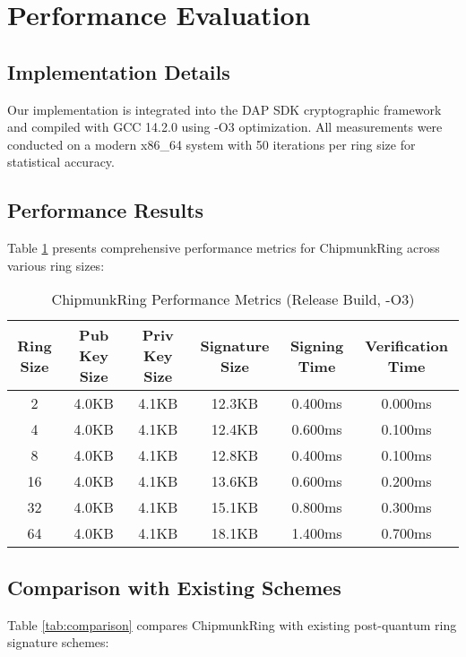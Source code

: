 \documentclass[11pt,a4paper]{article}
\begin{document}
\section{Performance Evaluation}

\subsection{Implementation Details}

Our implementation is integrated into the DAP SDK cryptographic framework and compiled with GCC 14.2.0 using -O3 optimization. All measurements were conducted on a modern x86\_64 system with 50 iterations per ring size for statistical accuracy.

\subsection{Performance Results}

Table \ref{tab:performance} presents comprehensive performance metrics for ChipmunkRing across various ring sizes:

\begin{table}[h]
\centering
\caption{ChipmunkRing Performance Metrics (Release Build, -O3)}
\label{tab:performance}
\begin{tabular}{@{}cccccc@{}}
\toprule
Ring Size & Pub Key Size & Priv Key Size & Signature Size & Signing Time & Verification Time \\
\midrule
2 & 4.0KB & 4.1KB & 12.3KB & 0.400ms & 0.000ms \\
4 & 4.0KB & 4.1KB & 12.4KB & 0.600ms & 0.100ms \\
8 & 4.0KB & 4.1KB & 12.8KB & 0.400ms & 0.100ms \\
16 & 4.0KB & 4.1KB & 13.6KB & 0.600ms & 0.200ms \\
32 & 4.0KB & 4.1KB & 15.1KB & 0.800ms & 0.300ms \\
64 & 4.0KB & 4.1KB & 18.1KB & 1.400ms & 0.700ms \\
\bottomrule
\end{tabular}
\end{table}

\subsection{Comparison with Existing Schemes}

Table \ref{tab:comparison} compares ChipmunkRing with existing post-quantum ring signature schemes:
\end{document}
